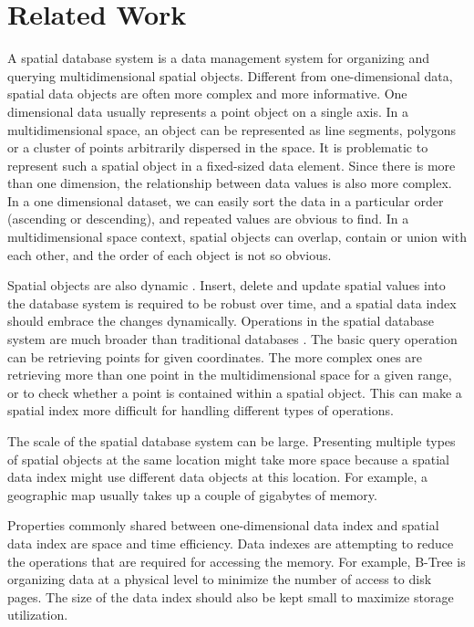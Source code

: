 \chapter{Related Work}
A spatial database system is a data management system for organizing and querying multidimensional spatial objects. Different from one-dimensional data, spatial data objects are often more complex and more informative. One dimensional data usually represents a point object on a single axis. In a multidimensional space, an object can be represented as line segments, polygons or a cluster of points arbitrarily dispersed in the space. It is problematic to represent such a spatial object in a fixed-sized data element. Since there is more than one dimension, the relationship between data values is also more complex. In a one dimensional dataset, we can easily sort the data in a particular order (ascending or descending), and repeated values are obvious to find. In a multidimensional space context, spatial objects can overlap, contain or union with each other, and the order of each object is not so obvious. 

Spatial objects are also dynamic \cite{Gaede:1998fp}. Insert, delete and update spatial values into the database system is required to be robust over time, and a spatial data index should embrace the changes dynamically. Operations in the spatial database system are much broader than traditional databases \cite{Gaede:1998fp}. The basic query operation can be retrieving points for given coordinates. The more complex ones are retrieving more than one point in the multidimensional space for a given range, or to check whether a point is contained within a spatial object. This can make a spatial index more difficult for handling different types of operations. 

The scale of the spatial database system can be large. Presenting multiple types of spatial objects at the same location might take more space because a spatial data index might use different data objects at this location. For example, a geographic map usually takes up a couple of gigabytes of memory. 

Properties commonly shared between one-dimensional data index and spatial data index are space and time efficiency. Data indexes are attempting to reduce the operations that are required for accessing the memory. For example, B-Tree \cite{Bayer:2002ds} is organizing data at a physical level to minimize the number of access to disk pages. The size of the data index should also be kept small to maximize storage utilization. 

